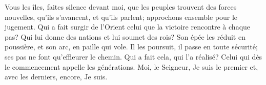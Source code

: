 Vous les îles, faites silence devant moi,
	que les peuples trouvent des forces nouvelles, qu’ils s’avancent, et qu’ils parlent;
	approchons ensemble pour le jugement.
Qui a fait surgir de l’Orient celui que la victoire rencontre à chaque pas?
	Qui lui donne des nations et lui soumet des rois?
	Son épée les réduit en poussière, et son arc, en paille qui vole.
Il les poursuit, il passe en toute sécurité;
	ses pas ne font qu’effleurer le chemin.
Qui a fait cela, qui l’a réalisé?
	Celui qui dès le commencement appelle les générations.
Moi, le Seigneur, Je suis le premier
	et, avec les derniers, encore, Je suis.
